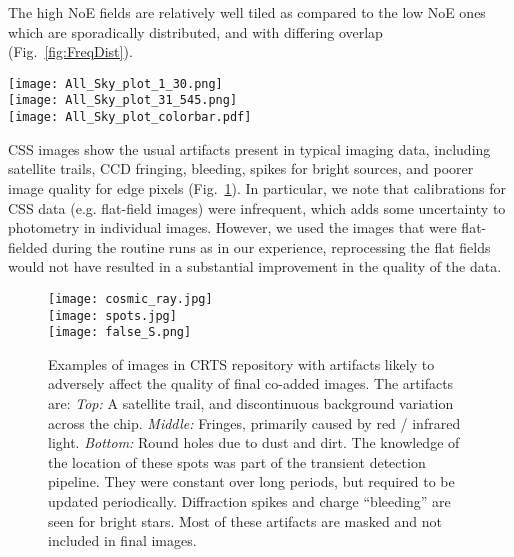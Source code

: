 \documentclass[fleqn,usenatbib]{mnras}
\begin{document}

The high NoE fields are relatively well tiled as compared to the low NoE ones which are sporadically distributed, and with differing overlap (Fig.~\ref{fig:FreqDist}).

\begin{figure*}
\centering
\texttt{[image: All\_Sky\_plot\_1\_30.png]}\\
\texttt{[image: All\_Sky\_plot\_31\_545.png]}\\
\texttt{[image: All\_Sky\_plot\_colorbar.pdf]}
\caption{Distribution of fields over the sky, color-coded to show the NoE (number of images): \textit{top}: shows, 4871 fields with NoE between 1-30  and \textit{bottom}: shows 2801 fields with NoE between 31-545.}
\label{fig:FreqDist}
\end{figure*}



CSS images show the usual artifacts present in typical imaging data, including satellite trails, CCD fringing, bleeding, spikes for bright sources, and poorer image quality for edge pixels (Fig.~\ref{fig:CR}). In particular, we note that calibrations for CSS data (e.g. flat-field images) were infrequent, which adds some uncertainty to photometry in individual images. However, we used the images that were flat-fielded during the routine runs as in our experience, reprocessing the flat fields would not have resulted in a substantial improvement in the quality of the data.



\begin{figure}
\centering
\texttt{[image: cosmic\_ray.jpg]}\\
\texttt{[image: spots.jpg]}\\
\texttt{[image: false\_S.png]}
\caption{Examples of images in CRTS repository with artifacts likely to adversely affect the quality of final co-added images. The artifacts are: \textit{Top:} A satellite trail, and discontinuous background variation across the chip. \textit{Middle:} Fringes, primarily caused by red / infrared light. \textit{Bottom:} Round holes due to dust and dirt. The knowledge of the location of these spots was part of the transient detection pipeline. They were constant over long periods, but required to be updated periodically.
Diffraction spikes and charge ``bleeding'' are seen for bright stars. 
Most of these artifacts are masked and not included in final images.
}
\label{fig:CR}
\end{figure}
\end{document}
